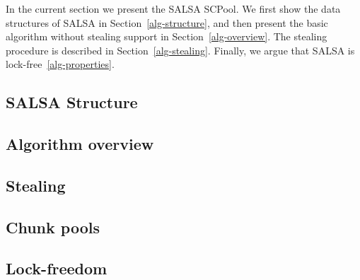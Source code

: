 In the current section we present the SALSA SCPool. We first show the data structures of SALSA in Section~\ref{alg-structure}, and then present the basic algorithm without stealing support in Section~\ref{alg-overview}. The stealing procedure is described in Section~\ref{alg-stealing}. 
Finally, we argue that SALSA is lock-free~\ref{alg-properties}. 

\subsection{SALSA Structure\label{alg-structure}}

\subsection{Algorithm overview\label{alg-overview}}

\subsection{Stealing\label{alg-stealing}}

\subsection{Chunk pools\label{alg-pools}}

\subsection{Lock-freedom\label{alg-properties}}

